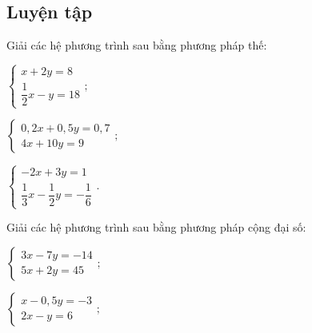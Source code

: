 \begin{practice}
    \subsection{Luyện tập}

    \begin{questions}[resume=SBT]
        \item Giải các hệ phương trình sau bằng phương pháp thế:
        \begin{questions}
            \item $\begin{cases}x+2y=8\\\dfrac{1}{2}x-y=18\end{cases};$

            \answerline
            \answerline
            \answerline

            \item $\begin{cases}0{,}2x+0{,}5y=0{,}7\\4x+10y=9\end{cases};$

            \answerline
            \answerline
            \answerline

            \item $\begin{cases}-2x+3y=1\\\dfrac{1}{3}x-\dfrac{1}{2}y=-\dfrac{1}{6}\end{cases}.$

            \answerline
            \answerline
            \answerline
        \end{questions}

        \item Giải các hệ phương trình sau bằng phương pháp cộng đại số:
        \begin{questions}
            \item $\begin{cases}3x-7y=-14\\5x+2y=45\end{cases};$

            \answerline
            \answerline
            \answerline

            \item $\begin{cases}x-0{,}5y=-3\\2x-y=6\end{cases};$


\end{questions}
\end{questions}
\end{practice}
